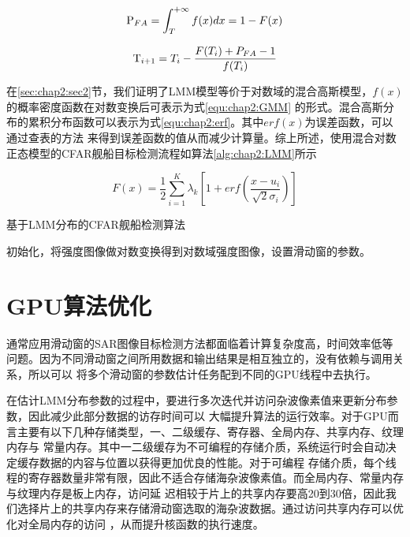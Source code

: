     \begin{equation}
      \label{equ:chap2:detecthres}
      {{\rm{P}}_{FA}} = \int_T^{ + \infty } {f(x)dx = 1 - F(x)}
    \end{equation}

    \begin{equation}
      \label{equ:chap2:newtonupdate}
      {{\rm{T}}_{i + 1}} = {T_i} - \frac{{F({T_i}) + {P_{FA}} - 1}}{{f({T_i})}}
    \end{equation}

    在\ref{sec:chap2:sec2}节，我们证明了LMM模型等价于对数域的混合高斯模型，$f(x)$的概率密度函数在对数变换后可表示为式\ref{equ:chap2:GMM}
    的形式。混合高斯分布的累积分布函数可以表示为式\ref{equ:chap2:erf}。其中$erf(x)$为误差函数，可以通过查表的方法
    来得到误差函数的值从而减少计算量。综上所述，使用混合对数正态模型的CFAR舰船目标检测流程如算法\ref{alg:chap2:LMM}所示

    \begin{equation}
      \label{equ:chap2:erf}
      F(x) = \frac{1}{2}\sum\limits_{i = 1}^K {{\lambda _k}[1 + erf(\frac{{x - {u_i}}}{{\sqrt 2 {\sigma _i}}})]}
    \end{equation}


    \begin{algorithm}[t]
      \caption{基于LMM分布的CFAR舰船检测算法}
      \label{alg:chap2:LMM}
      \BlankLine
      初始化，将强度图像做对数变换得到对数域强度图像，设置滑动窗的参数。

    \end{algorithm}

\section{GPU算法优化}
    通常应用滑动窗的SAR图像目标检测方法都面临着计算复杂度高，时间效率低等问题。因为不同滑动窗之间所用数据和输出结果是相互独立的，没有依赖与调用关系，所以可以
    将多个滑动窗的参数估计任务配到不同的GPU线程中去执行。

    在估计LMM分布参数的过程中，要进行多次迭代并访问杂波像素值来更新分布参数，因此减少此部分数据的访存时间可以
    大幅提升算法的运行效率。对于GPU而言主要有以下几种存储类型，一、二级缓存、寄存器、全局内存、共享内存、纹理内存与
    常量内存。其中一二级缓存为不可编程的存储介质，系统运行时会自动决定缓存数据的内容与位置以获得更加优良的性能。对于可编程
    存储介质，每个线程的寄存器数量非常有限，因此不适合存储海杂波像素值。而全局内存、常量内存与纹理内存是板上内存，访问延
    迟相较于片上的共享内存要高20到30倍，因此我们选择片上的共享内存来存储滑动窗选取的海杂波数据。通过访问共享内存可以优化对全局内存的访问
    ，从而提升核函数的执行速度。

